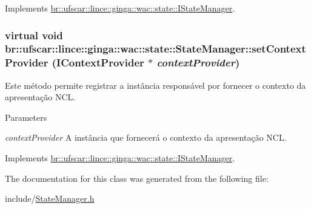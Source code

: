 Implements \hyperlink{classbr_1_1ufscar_1_1lince_1_1ginga_1_1wac_1_1state_1_1IStateManager_a8fe894ac51f00b4d3633d93135678e0c}{br::ufscar::lince::ginga::wac::state::IStateManager}.

\hypertarget{classbr_1_1ufscar_1_1lince_1_1ginga_1_1wac_1_1state_1_1StateManager_a118df2766ab99574653b4f45d1ea75fd}{
\subsubsection[{setContextProvider}]{\setlength{\rightskip}{0pt plus 5cm}virtual void br::ufscar::lince::ginga::wac::state::StateManager::setContextProvider ({\bf IContextProvider} $\ast$ {\em contextProvider})}}
\label{classbr_1_1ufscar_1_1lince_1_1ginga_1_1wac_1_1state_1_1StateManager_a118df2766ab99574653b4f45d1ea75fd}


Este método permite registrar a instância responsável por fornecer o contexto da apresentação NCL. 


\begin{DoxyParams}{Parameters}
\item[{\em contextProvider}]A instância que fornecerá o contexto da apresentação NCL. \end{DoxyParams}


Implements \hyperlink{classbr_1_1ufscar_1_1lince_1_1ginga_1_1wac_1_1state_1_1IStateManager_a3e9493dcb1e1dbfd6171252fb2edca8d}{br::ufscar::lince::ginga::wac::state::IStateManager}.



The documentation for this class was generated from the following file:\begin{DoxyCompactItemize}
\item 
include/\hyperlink{StateManager_8h}{StateManager.h}\end{DoxyCompactItemize}
